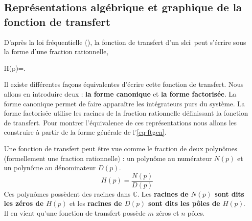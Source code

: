 \subsection
[Représentation de la fonction de transfert]
{Représentations algébrique et graphique de la fonction de transfert}
D'après la loi fréquentielle (), la fonction de transfert 
d'un \gls{slci}~peut s'écrire sous la forme d'une fraction rationnelle,
\begin{bequation}
H(p)=. 
\label{eq-ftgen}
\end{bequation}
Il existe différentes façons équivalentes d'écrire cette fonction de transfert.
Nous allons en introduire deux :
\textbf{la forme canonique} et \textbf{la forme factorisée}. La forme canonique 
permet de faire apparaître les intégrateurs purs du système. La forme 
factorisée utilise les racines de la fraction rationnelle définissant la 
fonction de transfert. Pour montrer l'équivalence de ces représentations 
nous allons les construire à partir de la forme générale de l'\cref{eq-ftgen}.

Une fonction de transfert peut être vue comme le fraction de deux polynômes 
(formellement une fraction rationnelle) : un polynôme au numérateur $N(p)$ 
et un polynôme au dénominateur $D(p)$.
\[
    H(p)=\dfrac{N(p)}{D(p)}
\]
Ces polynômes possèdent des racines dans $\mathbb{C}$. Les 
\textbf{racines de $N(p)$ sont dits les zéros de $H(p)$} et 
les \textbf{racines de $D(p)$ sont dits les pôles de $H(p)$}.
Il en vient qu'une fonction de transfert possède $m$ zéros et $n$ pôles.
